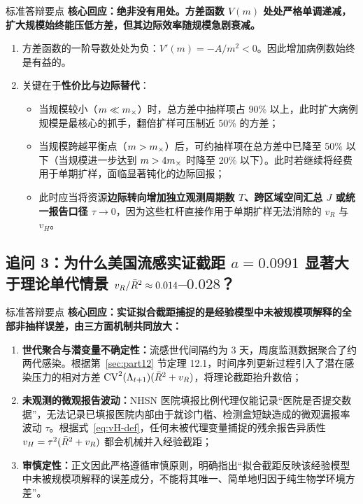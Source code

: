 \begin{derivationbox}{标准答辩要点}
\textbf{核心回应：绝非没有用处。方差函数 $V(m)$ 处处严格单调递减，扩大规模始终能压低方差，但其边际效率随规模急剧衰减。}
\begin{enumerate}
  \item 方差函数的一阶导数处处为负：$V'(m) = -A/m^2 < 0$。因此增加病例数始终是有益的。
  \item 关键在于\textbf{性价比与边际替代}：
  \begin{itemize}
    \item 当规模较小（$m \ll m_\times$）时，总方差中抽样项占 90\% 以上，此时扩大病例规模是最核心的抓手，翻倍扩样可压制近 50\% 的方差；
    \item 当规模跨越平衡点（$m > m_\times$）后，可约抽样项在总方差中已降至 50\% 以下（当规模进一步达到 $m > 4m_\times$ 时降至 20\% 以下）。此时若继续将经费用于单期扩样，面临显著钝化的边际回报；
    \item 此时应当将资源\textbf{边际转向增加独立观测周期数 $T$、跨区域空间汇总 $J$ 或统一报告口径 $\tau \to 0$}，因为这些杠杆直接作用于单期扩样无法消除的 $v_R$ 与 $v_H$。
  \end{itemize}
\end{enumerate}
\end{derivationbox}

\subsection{追问 3：为什么美国流感实证截距 $a = 0.0991$ 显著大于理论单代情景 $v_R/\bar{R}^2 \approx 0.014$--$0.028$？}

\begin{derivationbox}{标准答辩要点}
\textbf{核心回应：实证拟合截距捕捉的是经验模型中未被规模项解释的全部非抽样误差，由三方面机制共同放大：}
\begin{enumerate}
  \item \textbf{世代聚合与潜变量不确定性：}流感世代间隔约为 3 天，周度监测数据聚合了约两代感染。根据第~\ref{sec:part12} 节定理 12.1，时间序列更新过程引入了潜在感染压力的相对方差 $\mathrm{CV}^2(\Lambda_{t+1}) (\bar{R}^2 + v_R)$，将理论截距抬升数倍；
  \item \textbf{未观测的微观报告波动：}NHSN 医院填报比例代理仅能记录“医院是否提交数据”，无法记录已填报医院内部由于就诊门槛、检测盒短缺造成的微观漏报率波动 $\tau$。根据式~\eqref{eq:vH-def}，任何未被代理变量捕捉的残余报告异质性 $v_H = \tau^2(\bar{R}^2+v_R)$ 都会机械并入经验截距；
  \item \textbf{审慎定性：}正文因此严格遵循审慎原则，明确指出“拟合截距反映该经验模型中未被规模项解释的误差成分，不能将其唯一、简单地归因于纯生物学环境方差”。
\end{enumerate}
\end{derivationbox}

